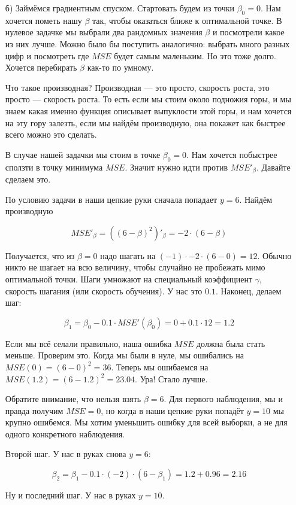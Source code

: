 \documentclass[12pt, a4paper, oneside]{article}
\begin{document}
{\begin{enumerate}
	
	\item[б)]  Займёмся градиентным спуском. Стартовать будем из точки $\beta_0 = 0$. Нам хочется пометь нашу $\beta$ так, чтобы оказаться ближе к оптимальной точке. В нулевое задачке мы выбрали два рандомных значения $\beta$ и посмотрели какое из них лучше. Можно было бы поступить аналогично: выбрать много разных цифр и посмотреть где $MSE$ будет самым маленьким. Но это тоже долго.	Хочется перебирать $\beta$ как-то по умному. 
	
	Что такое производная? Производная --- это просто, скорость роста, это просто --- скорость роста.  То есть если мы стоим около подножия горы, и мы знаем какая именно функция описывает выпуклости этой горы, и нам хочется на эту гору залезть, если мы найдём производную, она покажет как быстрее всего можно это сделать. 
	
	В случае нашей задачки мы стоим в точке $\beta_0 = 0$. Нам хочется побыстрее сползти в точку минимума $MSE$.  Значит нужно идти против $MSE'_{\beta}$.  Давайте сделаем это. 
	
	По условию задачи в наши цепкие руки сначала попадает $y = 6$. Найдём производную 
	
	$$
	MSE'_{\beta} = ((6 - \beta)^2 )'_{\beta}= -2 \cdot (6 - \beta) 
	$$

	Получается, что из $\beta = 0$ надо шагать на $(-1) \cdot -2 \cdot (6 - 0) = 12$. Обычно никто не шагает на всю величину, чтобы случайно не пробежать мимо оптимальной точки. Шаги умножают на специальный коэффициент $\gamma$, скорость шагания (или скорость обучения). У нас это $0.1$. Наконец, делаем шаг: 
	
	$$
	\beta_1 = \beta_0 - 0.1 \cdot MSE'(\beta_0) = 0 + 0.1 \cdot 12 =  1.2
	$$
	
	Если мы всё селали правильно, наша ошибка $MSE$ должна была стать меньше. Проверим это. Когда мы были в нуле, мы ошибались на $MSE(0) = (6 - 0)^2 = 36$.  Теперь мы ошибаемся на $MSE(1.2) = (6 - 1.2)^2 = 23.04$. Ура! Стало лучше.  
	
	Обратите внимание, что нельзя взять $\beta = 6$. Для первого наблюдения, мы и правда получим $MSE=0$, но когда в наши цепкие руки попадёт $y=10$ мы крупно ошибемся. Мы хотим уменьшить ошибку для всей выборки, а не для одного конкретного наблюдения. 
	
	Второй шаг. У нас в руках снова $y = 6$: 
	
	$$
	\beta_2 = \beta_1 - 0.1 \cdot (-2) \cdot (6 - \beta_1) = 1.2 + 0.96 = 2.16
	$$
	
	Ну и последний шаг. У  нас в руках $y = 10$. 
	

\end{enumerate}}
\end{document}
